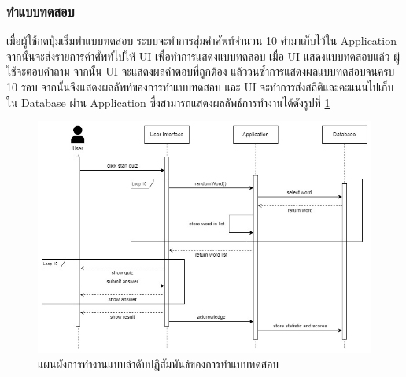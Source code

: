 \documentclass[12pt,oneside,openright,a4paper]{cpe-thai-project}
\begin{document}
\subsubsection{ทำแบบทดสอบ}
\hspace{1cm}
เมื่อผู้ใช้กดปุ่มเริ่มทำแบบทดสอบ ระบบจะทำการสุ่มคำศัพท์จำนวน 10 คำมาเก็บไว้ใน Application จากนั้นจะส่งรายการคำศัพท์ไปให้ UI เพื่อทำการแสดงแบบทดสอบ
เมื่อ UI แสดงแบบทดสอบแล้ว ผู้ใช้จะตอบคำถาม จากนั้น UI จะแสดงผลคำตอบที่ถูกต้อง แล้ววนซ้ำการแสดงผลแบบทดสอบจนครบ 10 รอบ จากนั้นจึงแสดงผลลัพท์ของการทำแบบทดสอบ
และ UI จะทำการส่งสถิติและคะแนนไปเก็บใน Database ผ่าน Application ซึ่งสามารถแสดงผลลัพธ์การทำงานได้ดังรูปที่ \ref{fig:S_Quiz}
\begin{figure}[!h]\centering
	\includegraphics[width=\textwidth, keepaspectratio=true]{image/chap3/sequence/Quiz.jpg}
	\caption{แผนผังการทำงานแบบลำดับปฏิสัมพันธ์ของการทำแบบทดสอบ}\label{fig:S_Quiz}
\end{figure}

\pagebreak
\end{document}
